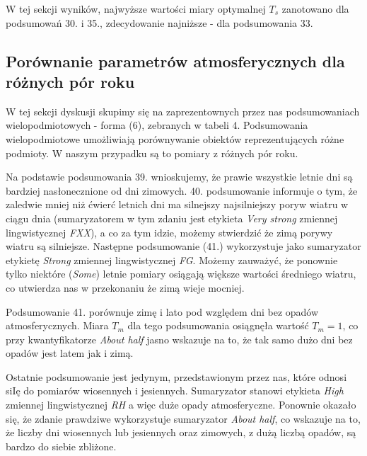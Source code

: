 \documentclass{classrep}
\begin{document}
W tej sekcji wyników, najwyższe wartości miary optymalnej $T_s$ zanotowano dla podsumowań 30. i 35., zdecydowanie najniższe - dla podsumowania 33.


\subsection{Porównanie parametrów atmosferycznych dla różnych pór roku}
W tej sekcji dyskusji skupimy się na zaprezentownych przez nas podsumowaniach wielopodmiotowych - forma (6), zebranych w tabeli 4. Podsumowania wielopodmiotowe umożliwiają porównywanie obiektów reprezentujących różne podmioty. W naszym przypadku są to pomiary z różnych pór roku.\newline

Na podstawie podsumowania 39. wnioskujemy, że prawie wszystkie letnie dni są bardziej nasłonecznione od dni zimowych. 40. podsumowanie informuje o tym, że zaledwie mniej niż ćwierć letnich dni ma silnejszy najsilniejszy poryw wiatru w ciągu dnia (sumaryzatorem w tym zdaniu jest etykieta \textit{Very strong} zmiennej lingwistycznej \textit{FXX}), a co za tym idzie, możemy stwierdzić że zimą porywy wiatru są silniejsze. Następne podsumowanie (41.) wykorzystuje jako sumaryzator etykietę \textit{Strong} zmiennej lingwistycznej \textit{FG}. Możemy zauważyć, że ponownie tylko niektóre (\textit{Some}) letnie pomiary osiągają większe wartości średniego wiatru, co utwierdza nas w przekonaniu że zimą wieje mocniej.\newline

Podsumowanie 41. porównuje zimę i lato pod względem dni bez opadów atmosferycznych. Miara $T_m$ dla tego podsumowania osiągnęła wartość $T_m = 1$, co przy kwantyfikatorze \textit{About half} jasno wskazuje na to, że tak samo dużo dni bez opadów jest latem jak i zimą.\newline

Ostatnie podsumowanie jest jedynym, przedstawionym przez nas, które odnosi siIę do pomiarów wiosennych i jesiennych. Sumaryzator stanowi etykieta \textit{High} zmiennej lingwistycznej \textit{RH} a więc duże opady atmosferyczne. Ponownie okazało się, że zdanie prawdziwe wykorzystuje sumaryzator \textit{About half}, co wskazuje na to, że liczby dni wiosennych lub jesiennych oraz zimowych, z dużą liczbą opadów, są bardzo do siebie zbliżone. 
\end{document}
